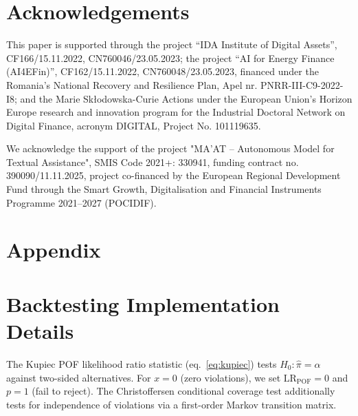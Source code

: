 \documentclass[preprint,11pt,authoryear]{elsarticle}
\newcommand{\1}{\boldsymbol{1}}
\begin{document}
	\section*{Acknowledgements}
	This paper is supported through the project ``IDA Institute of Digital Assets'', CF166/15.11.2022, CN760046/23.05.2023; the project ``AI for Energy Finance (AI4EFin)'', CF162/15.11.2022, CN760048/23.05.2023, financed under the Romania's National Recovery and Resilience Plan, Apel nr. PNRR-III-C9-2022-I8; and the Marie Skłodowska-Curie Actions under the European Union's Horizon Europe research and innovation program for the Industrial Doctoral Network on Digital Finance, acronym DIGITAL, Project No. 101119635.
	
	We acknowledge the support of the project "MA'AT – Autonomous
	Model for Textual Assistance", SMIS Code 2021+: 330941, funding contract no. 390090/11.11.2025, project co-financed by the European Regional Development Fund through the Smart Growth, Digitalisation and Financial Instruments Programme 2021–2027 (POCIDIF).
	
	
	
	
	
	
	
	
	\newpage
	\appendix
	\renewcommand{\thesection}{\Alph{section}}
	
	\section*{Appendix}
	
	\section{Backtesting Implementation Details}
	\label{app:backtesting}
	
	The Kupiec POF likelihood ratio statistic (eq.~\ref{eq:kupiec})
	tests $H_0: \hat\pi = \alpha$ against two-sided alternatives.
	For $x=0$ (zero violations), we set $\mathrm{LR}_{\mathrm{POF}}=0$
	and $p=1$ (fail to reject). The Christoffersen conditional coverage
	test \citep{christoffersen1998} additionally tests for independence
	of violations via a first-order Markov transition matrix.
	
\end{document}
